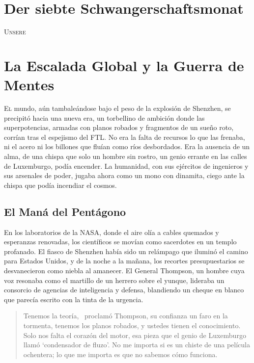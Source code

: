 

\chapter*{Der siebte Schwangerschaftsmonat}

\lettrine[lines=2, loversize=0.3, lraise=0]{\initfamily U}{nsere}

\chapter{La Escalada Global y la Guerra de Mentes}

\lettrine[lines=2, loversize=0.3, lraise=0]{E}{l} mundo, aún tambaleándose bajo el peso de la explosión de Shenzhen, se precipitó hacia una nueva era, un torbellino de ambición donde las superpotencias, armadas con planos robados y fragmentos de un sueño roto, corrían tras el espejismo del FTL. No era la falta de recursos lo que las frenaba, ni el acero ni los billones que fluían como ríos desbordados. Era la ausencia de un alma, de una chispa que solo un hombre sin rostro, un genio errante en las calles de Luxemburgo, podía encender. La humanidad, con sus ejércitos de ingenieros y sus arsenales de poder, jugaba ahora como un mono con dinamita, ciego ante la chispa que podía incendiar el cosmos.

\section{El Maná del Pentágono}

En los laboratorios de la NASA, donde el aire olía a cables quemados y esperanzas renovadas, los científicos se movían como sacerdotes en un templo profanado. El fiasco de Shenzhen había sido un relámpago que iluminó el camino para Estados Unidos, y de la noche a la mañana, los recortes presupuestarios se desvanecieron como niebla al amanecer. El General Thompson, un hombre cuya voz resonaba como el martillo de un herrero sobre el yunque, lideraba un consorcio de agencias de inteligencia y defensa, blandiendo un cheque en blanco que parecía escrito con la tinta de la urgencia.

\begin{quote}
\calli
\glqq Tenemos la teoría,\grqq~ proclamó Thompson, su confianza un faro en la tormenta, \glqq tenemos los planos robados, y ustedes tienen el conocimiento. Solo nos falta el corazón del motor, esa pieza que el genio de Luxemburgo llamó ‘condensador de fluzo’. No me importa si es un chiste de una película ochentera; lo que me importa es que no sabemos cómo funciona.\grqq
\end{quote}

